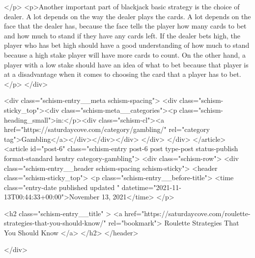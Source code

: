 {</p>
<p>Another important part of blackjack basic strategy is the choice of dealer. A lot depends on the way the dealer plays the cards. A lot depends on the face that the dealer has, because the face tells the player how many cards to bet and how much to stand if they have any cards left. If the dealer bets high, the player who has bet high should have a good understanding of how much to stand because a high stake player will have more cards to count. On the other hand, a player with a low stake should have an idea of what to bet because that player is at a disadvantage when it comes to choosing the card that a player has to bet.</p>
		</div>

		<div class="schism-entry__meta schism-spacing">			<div class="schism-sticky_top"><div class="schism-meta__categories"><p class="schism-heading_small">in:</p><div class="schism-cl"><a href="https://saturdaycove.com/category/gambling/" rel="category tag">Gambling</a></div></div></div>		</div>
	</div>
</article>
<article id="post-6" class="schism-entry post-6 post type-post status-publish format-standard hentry category-gambling">
	<div class="schism-row">		<div class="schism-entry__header schism-spacing schism-sticky">			<header class="schism-sticky_top">				<p class="schism-entry__before-title">
					<time class="entry-date published updated " datetime="2021-11-13T00:44:33+00:00">November 13, 2021</time>				</p>

				<h2 class="schism-entry__title" >
					<a href="https://saturdaycove.com/roulette-strategies-that-you-should-know/" rel="bookmark">
						Roulette Strategies That You Should Know					</a>
				</h2>
			</header>

					</div>

}
